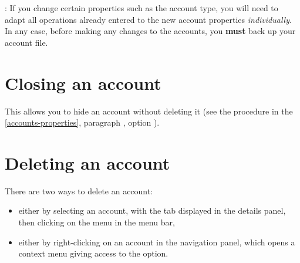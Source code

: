 \Attention{}: If you change certain properties such as the account type, you will need to adapt all operations already entered to the new account properties \emph{individually}. In any case, before making any changes to the accounts, you \textbf{must} back up your account file.

\section{Closing an account\label{accounts-closure}}%

This allows you to hide an account without deleting it (see the procedure in the \vref{accounts-properties}, paragraph , option ).


\section{Deleting an account\label{accounts-delete}}%

There are two ways to delete an account:
\begin{itemize}
	\item either by selecting an account, with the  tab displayed in the details panel, then clicking on the  menu in the menu bar,
	\item either by right-clicking on an account in the navigation panel, which opens a context menu giving access to the  option.
\end{itemize}

